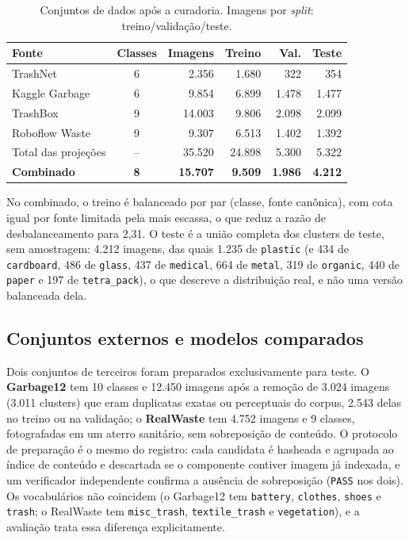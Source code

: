 \documentclass[11pt,a4paper]{article}
\begin{document}
	\begin{table}[htbp]
		\centering
		\footnotesize
		\caption{Conjuntos de dados após a curadoria. Imagens por \textit{split}: treino/validação/teste.}
		\label{tab:datasets}
		\begin{tabular}{lcrrrr}
			\toprule
			\textbf{Fonte} & \textbf{Classes} & \textbf{Imagens} & \textbf{Treino} & \textbf{Val.} & \textbf{Teste} \\
			\midrule
			TrashNet \cite{thung2016} & 6 & 2.356 & 1.680 & 322 & 354 \\
			Kaggle Garbage \cite{kaggle_garbage} & 6 & 9.854 & 6.899 & 1.478 & 1.477 \\
			TrashBox \cite{kumsetty2022} & 9 & 14.003 & 9.806 & 2.098 & 2.099 \\
			Roboflow Waste \cite{roboflow_waste} & 9 & 9.307 & 6.513 & 1.402 & 1.392 \\
			\midrule
			Total das projeções & -- & 35.520 & 24.898 & 5.300 & 5.322 \\
			\midrule
			\textbf{Combinado} & \textbf{8} & \textbf{15.707} & \textbf{9.509} & \textbf{1.986} & \textbf{4.212} \\
			\bottomrule
		\end{tabular}
	\end{table}
	
	No combinado, o treino é balanceado por par (classe, fonte canônica), com cota igual por fonte limitada pela mais escassa, o que reduz a razão de desbalanceamento para 2,31. O teste é a união completa dos clusters de teste, sem amostragem: 4.212 imagens, das quais 1.235 de \texttt{plastic} (e 434 de \texttt{cardboard}, 486 de \texttt{glass}, 437 de \texttt{medical}, 664 de \texttt{metal}, 319 de \texttt{organic}, 440 de \texttt{paper} e 197 de \texttt{tetra\_pack}), o que descreve a distribuição real, e não uma versão balanceada dela.
	
	\subsection{Conjuntos externos e modelos comparados}
	\label{sec:modelos}
	
	Dois conjuntos de terceiros foram preparados exclusivamente para teste. O \textbf{Garbage12} \cite{kaggle_garbage12} tem 10 classes e 12.450 imagens após a remoção de 3.024 imagens (3.011 clusters) que eram duplicatas exatas ou perceptuais do corpus, 2.543 delas no treino ou na validação; o \textbf{RealWaste} \cite{single2023} tem 4.752 imagens e 9 classes, fotografadas em um aterro sanitário, sem sobreposição de conteúdo. O protocolo de preparação é o mesmo do registro: cada candidata é hasheada e agrupada ao índice de conteúdo e descartada se o componente contiver imagem já indexada, e um verificador independente confirma a ausência de sobreposição (\texttt{PASS} nos dois). Os vocabulários não coincidem (o Garbage12 tem \texttt{battery}, \texttt{clothes}, \texttt{shoes} e \texttt{trash}; o RealWaste tem \texttt{misc\_trash}, \texttt{textile\_trash} e \texttt{vegetation}), e a avaliação trata essa diferença explicitamente.
	
\end{document}
